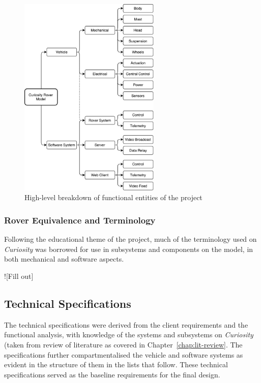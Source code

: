     \begin{figure}[h]
      \centering
      \includegraphics[width=0.6\textwidth]{figures/specs-functionalBreakdown}
      \caption[High-level breakdown of functional entities of the project]{High-level breakdown of functional entities of the project}
      \label{fig:specs-functionalBreakdown}
    \end{figure}
    
    \subsubsection{Rover Equivalence and Terminology}
    \label{subsubsec:rover-equivalence}
      Following the educational theme of the project, much of the terminology used on \textit{Curiosity} was borrowed for use in subsystems and components on the model, in both mechanical and software aspects.
      
      ![Fill out]
    
    
  \subsection{Technical Specifications}
  \label{sec:probDef-technicalSpecs}
    The technical specifications were derived from the client requirements and the functional analysis, with knowledge of the systems and subsystems on \textit{Curiosity} (taken from review of literature as covered in Chapter~\ref{chap:lit-review}. The specifications further compartmentalised the vehicle and software systems as evident in the structure of them in the lists that follow. These technical specifications served as the baseline requirements for the final design.
    

